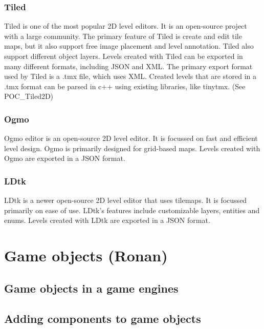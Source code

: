 \documentclass{article} %
\begin{document}
\subsubsection {Tiled}
Tiled is one of the most popular 2D level editors. 
It is an open-source project with a large community.
The primary feature of Tiled is create and edit tile maps, but it also support free image placement 
and level annotation. Tiled also support different object layers.
Levels created with Tiled can be exported in many different formats, including JSON and XML. The primary export format used by Tiled is a .tmx file, which uses XML.
Created levels that are stored in a .tmx format can be parsed in c++ using existing libraries, like tinytmx. (See POC\_Tiled2D)

\subsubsection {Ogmo}
Ogmo editor is an open-source 2D level editor. 
It is focussed on fast and efficient level design.
Ogmo is primarily designed for grid-based maps.
Levels created with Ogmo are exported in a JSON format.

\subsubsection {LDtk}
LDtk is a newer open-source 2D level editor that uses tilemaps.
It is focussed primarily on ease of use.
LDtk's features include customizable layers, entities and enums.
Levels created with LDtk are exported in a JSON format.


\section{Game objects (Ronan)}
\subsection{Game objects in a game engines}
\subsection{Adding components to game objects}

\newpage
\end{document}
